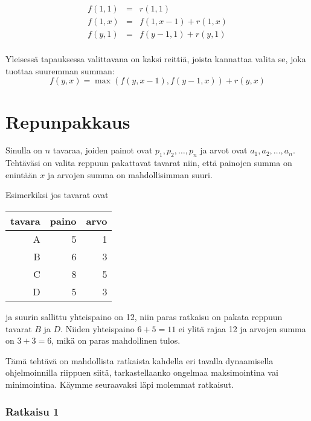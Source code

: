 \[
\begin{array}{lcl}
f(1,1) & = & r(1,1) \\
f(1,x) & = & f(1,x-1)+r(1,x) \\
f(y,1) & = & f(y-1,1)+r(y,1)\\
\end{array}
\]

Yleisessä tapauksessa valittavana on
kaksi reittiä,
joista kannattaa valita se,
joka tuottaa suuremman summan:
\[ f(y,x) = \max(f(y,x-1),f(y-1,x))+r(y,x)\]

\section{Repunpakkaus}


\begin{task}
Sinulla on $n$ tavaraa, joiden painot ovat
$p_1,p_2,\ldots,p_n$ ja arvot ovat
$a_1,a_2,\ldots,a_n$.
Tehtäväsi on valita reppuun pakattavat tavarat
niin, että painojen summa on enintään $x$
ja arvojen summa on mahdollisimman suuri.
\end{task}

\begin{samepage}
Esimerkiksi jos tavarat ovat

\begin{center}
\begin{tabular}{rrr}
tavara & paino & arvo \\
\hline
A & 5 & 1 \\
B & 6 & 3 \\
C & 8 & 5 \\
D & 5 & 3 \\
\end{tabular}
\end{center}
\end{samepage}

ja suurin sallittu yhteispaino on 12,
niin paras ratkaisu on pakata reppuun tavarat $B$ ja $D$.
Niiden yhteispaino $6+5=11$ ei ylitä rajaa 12
ja arvojen summa
on $3+3=6$, mikä on paras mahdollinen tulos.

Tämä tehtävä on mahdollista ratkaista kahdella eri
tavalla dynaamisella ohjelmoinnilla
riippuen siitä, tarkastellaanko ongelmaa
maksimointina vai minimointina.
Käymme seuraavaksi läpi molemmat ratkaisut.

\subsubsection{Ratkaisu 1}

